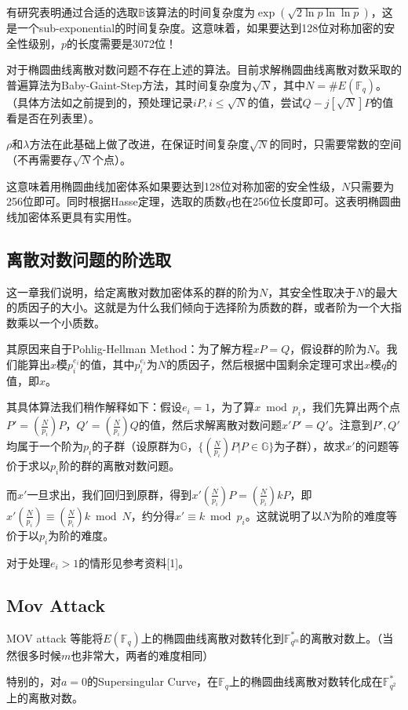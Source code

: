 \documentclass[12pt]{article}
\newcommand{\ec}{椭圆曲线}
\newcommand{\fq}{\mathbb{F}_q}
\begin{document}
有研究表明通过合适的选取$\mathbb{B}$该算法的时间复杂度为$\exp(\sqrt{2\ln p \ln\ln p})$，这是一个sub-exponential的时间复杂度。这意味着，如果要达到128位对称加密的安全性级别，$p$的长度需要是3072位！

对于椭圆曲线离散对数问题不存在上述的算法。目前求解\ec 离散对数采取的普遍算法为Baby-Gaint-Step方法，其时间复杂度为$\sqrt{N}$，其中$N=\# E(\mathbb{F}_q)$。（具体方法如之前提到的，预处理记录$iP, i \leq \sqrt{N}$的值，尝试$Q-j[\sqrt{N}]P$的值看是否在列表里）。

$\rho$和$\lambda$方法在此基础上做了改进，在保证时间复杂度$\sqrt{N}$的同时，只需要常数的空间（不再需要存$\sqrt{N}$个点）。

这意味着用\ec 加密体系如果要达到128位对称加密的安全性级，$N$只需要为256位即可。同时根据Hasse定理，选取的质数$q$也在256位长度即可。这表明\ec 加密体系更具有实用性。



\subsection{离散对数问题的阶选取}
这一章我们说明，给定离散对数加密体系的群的阶为$N$，其安全性取决于$N$的最大的质因子的大小。这就是为什么我们倾向于选择阶为质数的群，或者阶为一个大指数乘以一个小质数。

其原因来自于Pohlig-Hellman Method：为了解方程$xP=Q$，假设群的阶为$N$。我们能算出$x$模$p_i^{e_i}$的值，其中$p_i^{e_i}$为$N$的质因子，然后根据中国剩余定理可求出$x$模$q$的值，即$x$。

其具体算法我们稍作解释如下：假设$e_i=1$，为了算$x \bmod p_i$，我们先算出两个点$P' = (\frac{N}{p_i})P$，$Q' = (\frac{N}{p_i})Q$的值，然后求解离散对数问题$x'P'=Q'$。注意到$P',Q'$均属于一个阶为$p_i$的子群（设原群为$\mathbb{G}$，$\{(\frac{N}{p_i})P| P \in \mathbb{G}\}$为子群），故求$x'$的问题等价于求以$p_i$阶的群的离散对数问题。

而$x'$一旦求出，我们回归到原群，得到$x'(\frac{N}{p_i})P = (\frac{N}{p_i})kP$，即$x'(\frac{N}{p_i}) \equiv (\frac{N}{p_i})k \bmod N$，约分得$x' \equiv k \bmod p_i$。这就说明了以$N$为阶的难度等价于以$p_i$为阶的难度。

对于处理$e_i>1$的情形见参考资料[1]。
\subsection{Mov Attack}
MOV attack 等能将$E(\fq)$上的\ec 离散对数转化到$\mathbb{F}_{q^m}^*$的离散对数上。（当然很多时候$m$也非常大，两者的难度相同）

特别的，对$a=0$的Supersingular Curve，在$\fq$上的\ec 离散对数转化成在$\mathbb{F}_{q^2}^*$上的离散对数。
\end{document}
